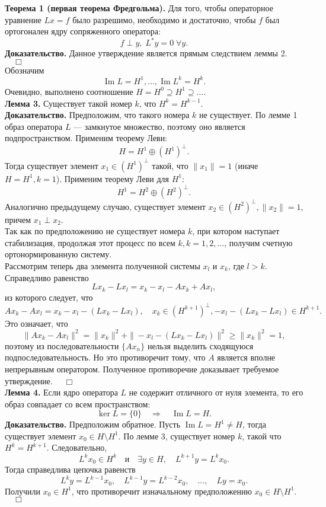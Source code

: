 \documentclass[12pt,a4paper, titlepage]{article}
\renewcommand{\Im}{\mathop{\mathrm{Im}}\nolimits}
\begin{document}
\textbf{Теорема 1 (первая теорема Фредгольма).} Для того, чтобы операторное уравнение $Lx = f$ было разрешимо, необходимо и достаточно, чтобы $f$ был ортогонален ядру сопряженного оператора:
$$
f \perp y, \; L^*y = 0 \; \forall y.
$$
\textbf{Доказательство.} Данное утверждение является прямым следствием леммы 2. $\quad\Box$\\












Обозначим
$$
\Im L = H^1, \ldots, \Im L^k = H^k.
$$
Очевидно, выполнено соотношение $H = H^0 \supseteq H^1 \supseteq \ldots$.\\

\textbf{Лемма 3.} Существует такой номер $k$, что $H^k = H^{k-1}$.\\
\textbf{Доказательство.} Предположим, что такого номера $k$ не существует. По лемме 1 образ оператора $L$ --- замкнутое множество, поэтому оно является подпространством. Применим теорему Леви:
$$
H = H^1 \oplus (H^1)^\perp.
$$
Тогда существует элемент $x_1 \in (H^1)^\perp$ такой, что $\|x_1\| = 1$ (иначе $H = H^1, k = 1$). Применим теорему Леви для $H^1$:
$$
H^1 = H^2 \oplus (H^2)^\perp.
$$
Аналогично предыдущему случаю, существует элемент $x_2 \in (H^2)^\perp, \|x_2\| = 1$, причем $x_1 \perp x_2$. \\

Так как по предположению не существует номера $k$, при котором наступает стабилизация, продолжая этот процесс по всем $k, k = 1, 2, \ldots$, получим счетную ортонормированную систему.\\

Рассмотрим теперь два элемента полученной системы $x_l$ и $x_k$, где $l > k$. Справедливо равенство
$$
Lx_k - Lx_l = x_k - x_l - Ax_k + Ax_l, 
$$ 
из которого следует, что
$$
Ax_k - Ax_l = x_k - x_l - (Lx_k - Lx_l), \quad x_k \in (H^{k+1})^\perp, -x_l - (Lx_k - Lx_l) \in H^{k+1}.
$$
Это означает, что
$$
\|Ax_k - Ax_l\|^2 = \|x_k\|^2 + \|-x_l - (Lx_k - Lx_l)\|^2 \geqslant \|x_k\|^2 = 1,
$$
поэтому из последовательности $\{Ax_n\}$ нельзя выделить сходящуюся подпоследовательность. Но это противоречит тому, что $A$ является вполне непрерывным оператором. Полученное противоречие доказывает требуемое утверждение. $\quad\Box$\\

\textbf{Лемма 4.} Если ядро оператора $L$ не содержит отличного от нуля элемента, то его образ совпадает со всем пространством:
$$
\ker L = \{0\} \quad \Rightarrow \quad \Im L = H.
$$
\textbf{Доказательство.} Предположим обратное. Пусть $\Im L = H^1 \neq H$, тогда существует элемент $x_0 \in H \setminus H^1$. По лемме 3, существует номер $k$, такой что $H^k = H^{k+1}$. Следовательно,
$$
L^k x_0 \in H^k \quad \text{и} \quad \exists y \in H, \quad L^{k+1}y = L^k x_0.
$$
Тогда справедлива цепочка равенств
$$
L^k y = L^{k-1} x_0, \quad L^{k-1}y = L^{k-2} x_0, \quad \ldots, \quad Ly = x_0.
$$
Получили $x_0 \in H^1$, что противоречит изначальному предположению $x_0 \in H \setminus H^1$. $\quad\Box$\\
\end{document}
